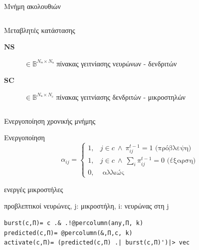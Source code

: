\documentclass[10pt,lualatex]{beamer}
\begin{document}
\begin{frame}{Μνήμη ακολουθιών}
{\begin{columns}[T]
\begin{block}{Μεταβλητές κατάστασης}
\begin{description}
        \item[$\mathbf{NS}$] $∈ 𝔹^{\mathit{Nₙ×Nₛ}}$ πίνακας γειτνίασης νευρώνων - δενδριτών
        \item[$\mathbf{SC}$] $∈ 𝔹^{\mathit{Nₛ×N_c}}$ πίνακας γειτνίασης δενδριτών - μικροστηλών
      \end{description}
    \end{block}
  \end{columns}
  }
\end{frame}

\begin{frame}[fragile]{Ενεργοποίηση χρονικής μνήμης}
\begin{block}{Ενεργοποίηση}
  \begin{equation}
    α_{ij}= \begin{cases} 1, &j \in c \:\wedge\: π_{ij}^{t-1}=1 \text{ (πρόβλεψη)}\\
                          1, &j \in c \:\wedge\: \sum_i π_{ij}^{t-1}=0 \text{ (έξαρση)}\\
                          0, &\text{ αλλιώς}
            \end{cases}
  \end{equation}
  \begin{description}[fffff]
    \item[$c$] ενεργές μικροστήλες
    \item[$π_{ij}$] προβλεπτικοί νευρώνες, j: μικροστήλη, i: νευρώνας στη j
  \end{description}
\end{block}
\begin{verbatim}
burst(c,Π)= c .& .!@percolumn(any,Π, k)
predicted(c,Π)= @percolumn(&,Π,c, k)
activate(c,Π)= (predicted(c,Π) .| burst(c,Π)')|> vec
\end{verbatim}
\end{frame}
\end{document}
